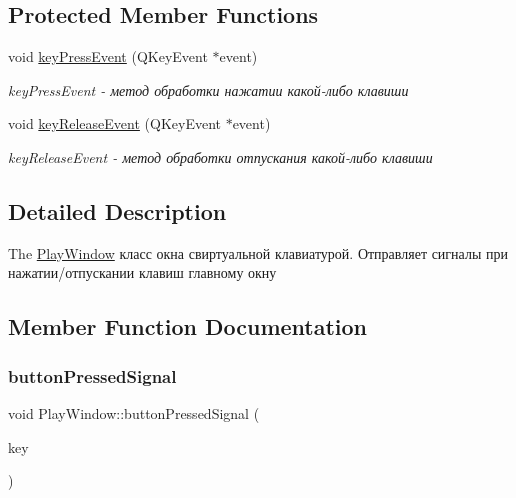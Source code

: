 \subsection*{Protected Member Functions}
\begin{DoxyCompactItemize}
\item 
void \hyperlink{class_play_window_aa931ee4edcea15ecb535c45db914fd83}{key\+Press\+Event} (Q\+Key\+Event $\ast$event)
\begin{DoxyCompactList}\small\item\em key\+Press\+Event -\/ метод обработки нажатии какой-\/либо клавиши \end{DoxyCompactList}\item 
void \hyperlink{class_play_window_a0812a60414cc058a491d65b9ed919f5f}{key\+Release\+Event} (Q\+Key\+Event $\ast$event)
\begin{DoxyCompactList}\small\item\em key\+Release\+Event -\/ метод обработки отпускания какой-\/либо клавиши \end{DoxyCompactList}\end{DoxyCompactItemize}


\subsection{Detailed Description}
The \hyperlink{class_play_window}{Play\+Window} класс окна свиртуальной клавиатурой. Отправляет сигналы при нажатии/отпускании клавиш главному окну 

\subsection{Member Function Documentation}
\mbox{\label{class_play_window_ae629638312cf77e32ca2d681988f67bb}} 
\subsubsection{\texorpdfstring{button\+Pressed\+Signal}{buttonPressedSignal}}
{\footnotesize\ttfamily void Play\+Window\+::button\+Pressed\+Signal (\begin{DoxyParamCaption}\item[{Q\+Char}]{key }\end{DoxyParamCaption})\hspace{0.3cm}{\ttfamily [signal]}}



